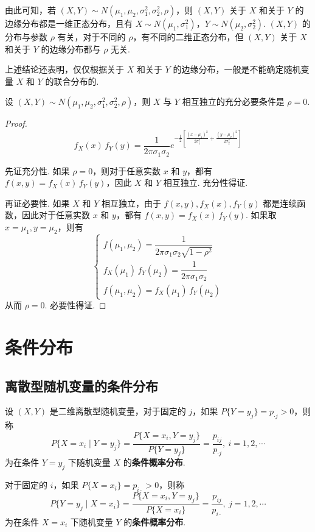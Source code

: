 由此可知，若 $(X,Y) \sim N(\mu_1,\mu_2,\sigma_1^2,\sigma_2^2,\rho)$，则 $(X,Y)$ 关于 $X$ 和关于 $Y$ 的边缘分布都是一维正态分布，且有 $X \sim N(\mu_1,\sigma_1^2)$，$Y \sim N(\mu_2,\sigma_2^2)$. $(X,Y)$ 的分布与参数 $\rho$ 有关，对于不同的 $\rho$，有不同的二维正态分布，但 $(X,Y)$ 关于 $X$ 和关于 $Y$ 的边缘分布都与 $\rho$ 无关.

上述结论还表明，仅仅根据关于 $X$ 和关于 $Y$ 的边缘分布，一般是不能确定随机变量 $X$ 和 $Y$ 的联合分布的.

\begin{conclusion}
    设 $(X,Y) \sim N(\mu_1,\mu_2,\sigma_1^2,\sigma_2^2,\rho)$，则 $X$ 与 $Y$ 相互独立的充分必要条件是 $\rho=0$.
\end{conclusion}

\begin{proof}
    $$
    f_{X}(x) \, f_{Y}(y) = \dfrac{1}{2 \pi \sigma_1 \sigma_2} e^{-\frac{1}{2} \left[ \frac{(x-\mu_1)^2}{2 \sigma_1^2} + \frac{(y-\mu_2)^2}{2 \sigma_2^2} \right]}
    $$

    先证充分性. 如果 $\rho=0$，则对于任意实数 $x$ 和 $y$，都有 $f(x,y) = f_{X}(x) \, f_{Y}(y)$，因此 $X$ 和 $Y$ 相互独立. 充分性得证.

    再证必要性. 如果 $X$ 和 $Y$ 相互独立，由于 $f(x,y), f_{X}(x), f_{Y}(y)$ 都是连续函数，因此对于任意实数 $x$ 和 $y$，都有 $f(x,y) = f_{X}(x) \, f_{Y}(y)$. 如果取 $x=\mu_1, y=\mu_2$，则有
    $$
    \begin{cases}
        f(\mu_1,\mu_2) = \dfrac{1}{2 \pi \sigma_1 \sigma_2 \sqrt{1-\rho^2}} \\[0.5em]
        f_{X}(\mu_1) \, f_{Y}(\mu_2) = \dfrac{1}{2 \pi \sigma_1 \sigma_2} \\[0.5em]
        f(\mu_1,\mu_2) = f_{X}(\mu_1) \, f_{Y}(\mu_2)
    \end{cases}
    $$
    从而 $\rho=0$. 必要性得证.
\end{proof}

\section{条件分布}

\subsection{离散型随机变量的条件分布}

\begin{definition}
    设 $(X,Y)$ 是二维离散型随机变量，对于固定的 $j$，如果 $P\{Y = y_j\} = p_{\cdot j} > 0$，则称
    $$
    P\{X=x_i \mid Y=y_j\} = \dfrac{P\{X=x_i, Y=y_j\}}{P\{Y=y_j\}} = \dfrac{p_{ij}}{p_{\cdot j}},\ i=1,2,\cdots
    $$
    为在条件 $Y=y_j$ 下随机变量 $X$ 的\textbf{条件概率分布}.
    
    对于固定的 $i$，如果 $P\{X=x_i\} = p_{i \cdot} > 0$，则称
    $$
    P\{Y=y_j \mid X=x_i\} = \dfrac{P\{X=x_i,Y=y_j\}}{P\{X=x_i\}} = \dfrac{p_{ij}}{p_{i \cdot}},\ j=1,2,\cdots
    $$
    为在条件 $X=x_i$ 下随机变量 $Y$ 的\textbf{条件概率分布}.
\end{definition}

